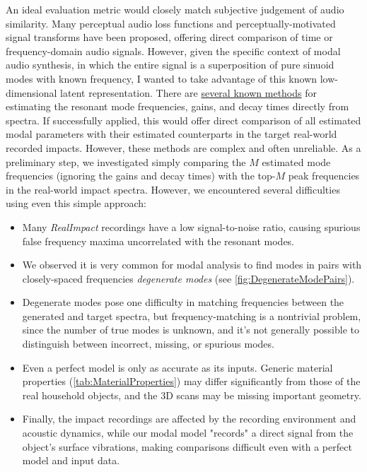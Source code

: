 \documentclass[12pt]{article}
\begin{document}
An ideal evaluation metric would closely match subjective judgement of audio similarity.
Many perceptual audio loss functions \cite{elbaz_perceptual_2017} and perceptually-motivated signal transforms \cite{smith_bark_1999} have been proposed, offering direct comparison of time or frequency-domain audio signals.
However, given the specific context of modal audio synthesis, in which the entire signal is a superposition of pure sinuoid modes with known frequency, I wanted to take advantage of this known low-dimensional latent representation.
There are \href{https://ccrma.stanford.edu/~jos/pasp/Modal_Expansion.html}{several known methods} \cite{smith_pasp} for estimating the resonant mode frequencies, gains, and decay times directly from spectra.
If successfully applied, this would offer direct comparison of all estimated modal parameters with their estimated counterparts in the target real-world recorded impacts.
However, these methods are complex and often unreliable.
As a preliminary step, we investigated simply comparing the $M$ estimated mode frequencies (ignoring the gains and decay times) with the top-$M$ peak frequencies in the real-world impact spectra.
However, we encountered several difficulties using even this simple approach:
\begin{itemize}
  \item Many \textit{RealImpact} recordings have a low signal-to-noise ratio, causing spurious false frequency maxima uncorrelated with the resonant modes.
  \item We observed it is very common for modal analysis to find modes in pairs with closely-spaced frequencies \textit{degenerate modes} \cite{afolabi_degenerate_modes} (see \ref{fig:DegenerateModePairs}).
  \item Degenerate modes pose one difficulty in matching frequencies between the generated and target spectra, but frequency-matching is a nontrivial problem, since the number of true modes is unknown, and it's not generally possible to distinguish between incorrect, missing, or spurious modes.
  \item Even a perfect model is only as accurate as its inputs. Generic material properties (\ref{tab:MaterialProperties}) may differ significantly from those of the real household objects, and the 3D scans may be missing important geometry.
  \item Finally, the impact recordings are affected by the recording environment and acoustic dynamics, while our modal model "records" a direct signal from the object's surface vibrations, making comparisons difficult even with a perfect model and input data.
\end{itemize}
\end{document}
